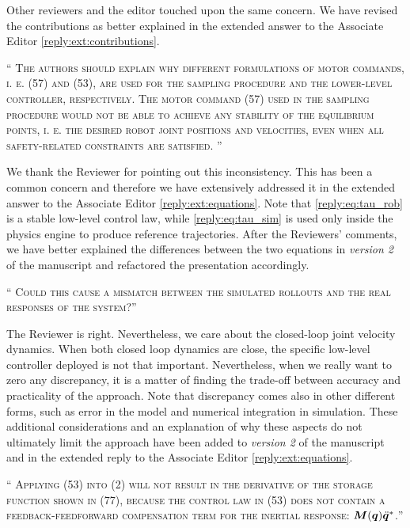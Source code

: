 \documentclass[10pt]{article}
\newcommand{\referee}[1]{\;
  \begin{minipage}[t]{.95\textwidth}
    ``{\small\color{red} \textsc{#1}}''
  \end{minipage}\medskip
  }
\newcommand{\version}[1]{\textit{version #1}}
\begin{document}
\begin{enumerate}[label={[R3:\,\arabic{enumi}]}]
Other reviewers and the editor touched upon the same concern. We have revised the contributions as better explained in the extended answer to the Associate Editor \ref{reply:ext:contributions}.

\item\label{reply:R3:2} 
\referee{The authors should explain why different formulations of motor commands, i. e. (57) and (53), are used for the sampling procedure and the lower-level controller, respectively. The motor command (57) used in the sampling procedure would not be able to achieve any stability of
the equilibrium points, i. e. the desired robot joint positions and velocities, even when all safety-related constraints are satisfied. }

We thank the Reviewer for pointing out this inconsistency. This has been a common concern and therefore we have extensively addressed it in the extended answer to the Associate Editor \ref{reply:ext:equations}. Note that \eqref{reply:eq:tau_rob} is a stable low-level control law, while \eqref{reply:eq:tau_sim} is used only inside the physics engine to produce reference trajectories. After the Reviewers' comments, we have better explained the differences between the two equations in \version{2} of the manuscript and refactored the presentation accordingly.

\referee{Could this cause a mismatch between the simulated rollouts and the real responses of the system?}

The Reviewer is right. Nevertheless, we care about the closed-loop joint velocity dynamics. When both closed loop dynamics are close, the specific low-level controller deployed is not that important. Nevertheless, when we really want to zero any discrepancy, it is a matter of finding the trade-off between accuracy and practicality of the approach. Note that discrepancy comes also in other different forms, such as error in the model and numerical integration in simulation. These additional considerations and an explanation of why these aspects do not ultimately limit the approach have been added to \version{2} of the manuscript and in the extended reply to the Associate Editor \ref{reply:ext:equations}.

\item\label{reply:R3:5} 
\referee{Applying (53) into (2) will not result in the derivative of the storage function shown in (77), because the control law in (53) does not contain a feedback-feedforward compensation term for the inertial response: $\bm{M}(\bm{q}) \ddot{\bm{q}}^*$.}


\end{enumerate}
\end{document}
